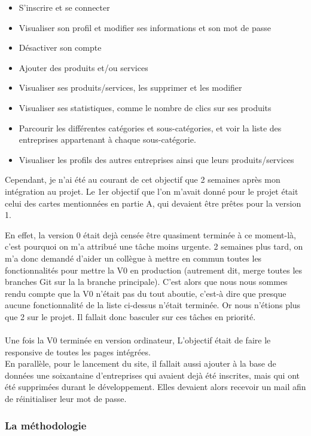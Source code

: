 \begin{itemize}
    \item S'inscrire et se connecter
    \item Visualiser son profil et modifier ses informations et son mot de passe
    \item Désactiver son compte
    \item Ajouter des produits et/ou services
    \item Visualiser ses produits/services, les supprimer et les modifier
    \item Visualiser ses statistiques, comme le nombre de clics sur ses produits
    \item Parcourir les différentes catégories et sous-catégories, et voir la liste des entreprises appartenant à chaque sous-catégorie.
    \item Visualiser les profils des autres entreprises ainsi que leurs produits/services
\end{itemize}

Cependant, je n'ai été au courant de cet objectif que 2 semaines après mon intégration au projet. 
Le 1er objectif que l'on m'avait donné pour le projet était celui des cartes mentionnées en partie A, qui devaient être prêtes pour la version 1. 

En effet, la version 0 était dejà censée être quasiment terminée à ce moment-là, c'est pourquoi on m'a attribué une tâche moins urgente. 
2 semaines plus tard, on m'a donc demandé d'aider un collègue à mettre en commun toutes les fonctionnalités pour mettre la V0 en production 
(autrement dit, merge toutes les branches Git sur la la branche principale).
C'est alors que nous nous sommes rendu compte que la V0 n'était pas du tout aboutie, c'est-à dire que presque aucune fonctionnalité de la liste ci-dessus n'était terminée. 
Or nous n'étions plus que 2 sur le projet. Il fallait donc basculer sur ces tâches en priorité.
\\\\
Une fois la V0 terminée en version ordinateur, L'objectif était de faire le responsive de toutes les pages intégrées. 
\\
En parallèle, pour le lancement du site, il fallait aussi ajouter à la base de données une soixantaine d'entreprises qui avaient dejà été inscrites, mais qui ont été supprimées durant le développement.
Elles devaient alors recevoir un mail afin de réinitialiser leur mot de passe.


\subsubsection{La méthodologie}

